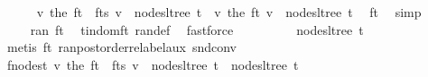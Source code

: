 \begin{isabellebody}
\ \ \ \ \isamarkupfalse%
\ {\isachardoublequoteopen}{\isacharparenleft}{\kern0pt}{\isasymlambda}v{\isachardot}{\kern0pt}\ the\ {\isacharparenleft}{\kern0pt}{\isacharparenleft}{\kern0pt}f{\isacharunderscore}{\kern0pt}t\ {\isacharplus}{\kern0pt}{\isacharplus}{\kern0pt}\ f{\isacharunderscore}{\kern0pt}ts{\isacharparenright}{\kern0pt}\ v{\isacharparenright}{\kern0pt}{\isacharparenright}{\kern0pt}\ {\isacharbackquote}{\kern0pt}\ nodes{\isacharunderscore}{\kern0pt}ltree\ t{\isacharprime}{\kern0pt}\ {\isacharequal}{\kern0pt}\ {\isacharparenleft}{\kern0pt}{\isasymlambda}v{\isachardot}{\kern0pt}\ the\ {\isacharparenleft}{\kern0pt}f{\isacharunderscore}{\kern0pt}t\ v{\isacharparenright}{\kern0pt}{\isacharparenright}{\kern0pt}\ {\isacharbackquote}{\kern0pt}\ nodes{\isacharunderscore}{\kern0pt}ltree\ t{\isacharprime}{\kern0pt}{\isachardoublequoteclose}\ \isamarkupfalse%
\ f{\isacharunderscore}{\kern0pt}t{\isacharprime}{\kern0pt}\ \isamarkupfalse%
\ simp\isanewline
\ \ \ \ \isamarkupfalse%
\ \isamarkupfalse%
\ {\isachardoublequoteopen}{\isasymdots}\ {\isasymsubseteq}\ ran\ f{\isacharunderscore}{\kern0pt}t{\isachardoublequoteclose}\ \isamarkupfalse%
\ t{\isacharprime}{\kern0pt}{\isacharunderscore}{\kern0pt}in{\isacharunderscore}{\kern0pt}dom{\isacharunderscore}{\kern0pt}f{\isacharunderscore}{\kern0pt}t\ ran{\isacharunderscore}{\kern0pt}def\ \isamarkupfalse%
\ fastforce\isanewline
\ \ \ \ \isamarkupfalse%
\ \isamarkupfalse%
\ {\isachardoublequoteopen}{\isasymdots}\ {\isacharequal}{\kern0pt}\ nodes{\isacharunderscore}{\kern0pt}ltree\ t{\isachardoublequoteclose}\ \isamarkupfalse%
\ {\isacharparenleft}{\kern0pt}metis\ f{\isacharunderscore}{\kern0pt}t\ ran{\isacharunderscore}{\kern0pt}postorder{\isacharunderscore}{\kern0pt}relabel{\isacharunderscore}{\kern0pt}aux\ snd{\isacharunderscore}{\kern0pt}conv{\isacharparenright}{\kern0pt}\isanewline
\ \ \ \ \isamarkupfalse%
\ \isamarkupfalse%
\ f{\isacharunderscore}{\kern0pt}nodes{\isacharunderscore}{\kern0pt}t{\isacharprime}{\kern0pt}{\isacharcolon}{\kern0pt}\ {\isachardoublequoteopen}{\isacharparenleft}{\kern0pt}{\isasymlambda}v{\isachardot}{\kern0pt}\ the\ {\isacharparenleft}{\kern0pt}{\isacharparenleft}{\kern0pt}f{\isacharunderscore}{\kern0pt}t\ {\isacharplus}{\kern0pt}{\isacharplus}{\kern0pt}\ f{\isacharunderscore}{\kern0pt}ts{\isacharparenright}{\kern0pt}\ v{\isacharparenright}{\kern0pt}{\isacharparenright}{\kern0pt}\ {\isacharbackquote}{\kern0pt}\ nodes{\isacharunderscore}{\kern0pt}ltree\ t{\isacharprime}{\kern0pt}\ {\isasymsubseteq}\ nodes{\isacharunderscore}{\kern0pt}ltree\ t{\isachardoublequoteclose}\ \isacommand{{\isachardot}{\kern0pt}}\isamarkupfalse%

\end{isabellebody}
